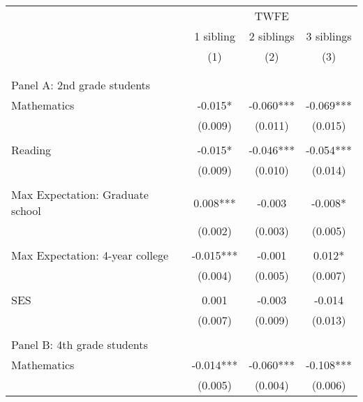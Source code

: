 \makeatletter
{}
{
\makeatother
\begin{tabular}{lccc}
\toprule
\cmidrule(lr){2-4}
& \multicolumn{3}{c}{TWFE} \\
\cmidrule(lr){2-4}
& 1 sibling & 2 siblings & 3 siblings  \\
\cmidrule(lr){2-2} \cmidrule(lr){3-3} \cmidrule(lr){4-4}
& (1) & (2) & (3)\\
\bottomrule
&  &  &  \\
&  &  &   \\
\multicolumn{4}{l}{Panel A: 2nd grade students } \\
Mathematics         &      -0.015*  &      -0.060***&      -0.069***\\
                    &     (0.009)   &     (0.011)   &     (0.015)   \\
 
&  &  &   \\
Reading             &      -0.015*  &      -0.046***&      -0.054***\\
                    &     (0.009)   &     (0.010)   &     (0.014)   \\
 
&  &  &   \\
Max Expectation: Graduate school&       0.008***&      -0.003   &      -0.008*  \\
                    &     (0.002)   &     (0.003)   &     (0.005)   \\
 
&  &  &   \\
Max Expectation: 4-year college&      -0.015***&      -0.001   &       0.012*  \\
                    &     (0.004)   &     (0.005)   &     (0.007)   \\
 
&  &  &   \\
SES                 &       0.001   &      -0.003   &      -0.014   \\
                    &     (0.007)   &     (0.009)   &     (0.013)   \\
 
&  &  &   \\
\multicolumn{4}{l}{Panel B: 4th grade students } \\
Mathematics         &      -0.014***&      -0.060***&      -0.108***\\
                    &     (0.005)   &     (0.004)   &     (0.006)   \\
 

\end{tabular}}
